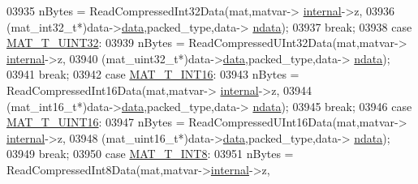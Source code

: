\begin{DoxyCode}
{{{{{{{{{{{{{{{{{{{03935                             nBytes = ReadCompressedInt32Data(mat,matvar->
      \hyperlink{group___m_a_t_a6e97e3ed9f40c49322c18561c2a94e92}{internal}->z,
03936                                  (mat\_int32\_t*)data->\hyperlink{group___m_a_t_ae2c648cb9eac4ce47f26cddb44246152}{data},packed\_type,data->
      \hyperlink{group___m_a_t_a1beb8a8c58a808207cbea650563a9b63}{ndata});
03937                             \textcolor{keywordflow}{break};
03938                         \textcolor{keywordflow}{case} \hyperlink{group___m_a_t_ggacf7b3b879282b7ab3a51190e49bf3453aa397e285a23fe240368b752897652c6a}{MAT\_T\_UINT32}:
03939                             nBytes = ReadCompressedUInt32Data(mat,matvar->
      \hyperlink{group___m_a_t_a6e97e3ed9f40c49322c18561c2a94e92}{internal}->z,
03940                                  (mat\_uint32\_t*)data->\hyperlink{group___m_a_t_ae2c648cb9eac4ce47f26cddb44246152}{data},packed\_type,data->
      \hyperlink{group___m_a_t_a1beb8a8c58a808207cbea650563a9b63}{ndata});
03941                             \textcolor{keywordflow}{break};
03942                         \textcolor{keywordflow}{case} \hyperlink{group___m_a_t_ggacf7b3b879282b7ab3a51190e49bf3453a8c5b2e381946e95ea8d81ac216743302}{MAT\_T\_INT16}:
03943                             nBytes = ReadCompressedInt16Data(mat,matvar->
      \hyperlink{group___m_a_t_a6e97e3ed9f40c49322c18561c2a94e92}{internal}->z,
03944                                  (mat\_int16\_t*)data->\hyperlink{group___m_a_t_ae2c648cb9eac4ce47f26cddb44246152}{data},packed\_type,data->
      \hyperlink{group___m_a_t_a1beb8a8c58a808207cbea650563a9b63}{ndata});
03945                             \textcolor{keywordflow}{break};
03946                         \textcolor{keywordflow}{case} \hyperlink{group___m_a_t_ggacf7b3b879282b7ab3a51190e49bf3453a05bc7af7680aa68be95126ae0a4c2e31}{MAT\_T\_UINT16}:
03947                             nBytes = ReadCompressedUInt16Data(mat,matvar->
      \hyperlink{group___m_a_t_a6e97e3ed9f40c49322c18561c2a94e92}{internal}->z,
03948                                  (mat\_uint16\_t*)data->\hyperlink{group___m_a_t_ae2c648cb9eac4ce47f26cddb44246152}{data},packed\_type,data->
      \hyperlink{group___m_a_t_a1beb8a8c58a808207cbea650563a9b63}{ndata});
03949                             \textcolor{keywordflow}{break};
03950                         \textcolor{keywordflow}{case} \hyperlink{group___m_a_t_ggacf7b3b879282b7ab3a51190e49bf3453a9807f5033ed4f9b548953742d9fd1658}{MAT\_T\_INT8}:
03951                             nBytes = ReadCompressedInt8Data(mat,matvar->\hyperlink{group___m_a_t_a6e97e3ed9f40c49322c18561c2a94e92}{internal}->z,
}}}}}}}}}}}}}}}}}}}
\end{DoxyCode}
